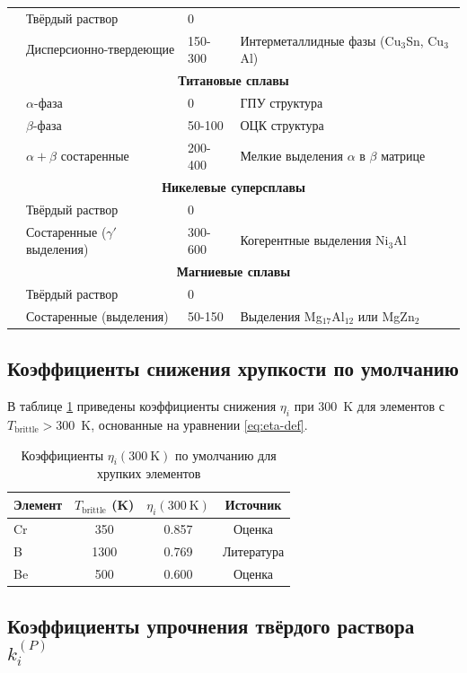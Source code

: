 \documentclass[12pt,a4paper]{article}
\begin{document}
\begin{longtable}{p{3.5cm} p{3.0cm} p{3.0cm} p{4cm}}
		& Твёрдый раствор & 0 & \\
		& Дисперсионно-твердеющие & 150-300 & Интерметаллидные фазы (Cu$_3$Sn, Cu$_3$Al) \\
		\hline
		\multicolumn{4}{c}{\textbf{Титановые сплавы}} \\
		& $\alpha$-фаза & 0 & ГПУ структура \\
		& $\beta$-фаза & 50-100 & ОЦК структура \\
		& $\alpha+\beta$ состаренные & 200-400 & Мелкие выделения $\alpha$ в $\beta$ матрице \\
		\hline
		\multicolumn{4}{c}{\textbf{Никелевые суперсплавы}} \\
		& Твёрдый раствор & 0 & \\
		& Состаренные ($\gamma'$ выделения) & 300-600 & Когерентные выделения Ni$_3$Al \\
		\hline
		\multicolumn{4}{c}{\textbf{Магниевые сплавы}} \\
		& Твёрдый раствор & 0 & \\
		& Состаренные (выделения) & 50-150 & Выделения Mg$_{17}$Al$_{12}$ или MgZn$_2$ \\
		\bottomrule
	\end{longtable}
	
	\subsection{Коэффициенты снижения хрупкости по умолчанию}
	\label{subsec:eta-table}
	В таблице \ref{tab:eta} приведены коэффициенты снижения $\eta_i$ при 300~K для элементов с $T_{\text{brittle}} > 300$~K, основанные на уравнении \ref{eq:eta-def}.
	\begin{table}[htbp]
		\centering
		\caption{Коэффициенты $\eta_i(300\ \mathrm{K})$ по умолчанию для хрупких элементов}
		\label{tab:eta}
		\begin{tabular}{lccc}
			\toprule
			\textbf{Элемент} & $T_{\text{brittle}}$ (K) & $\eta_i(300\ \mathrm{K})$ & \textbf{Источник} \\
			\midrule
			Cr & 350 & 0.857 & Оценка \\
			B  & 1300 & 0.769 & Литература \\
			Be & 500 & 0.600 & Оценка \\
			\bottomrule
		\end{tabular}
	\end{table}
	
	\subsection{Коэффициенты упрочнения твёрдого раствора $k_i^{(P)}$}
	\label{subsec:kss}
	
\end{document}
